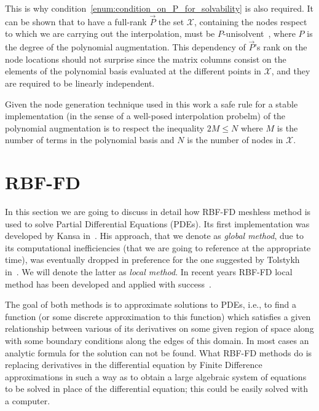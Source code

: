 This is why condition~\ref{enum:condition_on_P_for_solvability} is also required. It can be shown that to have a full-rank $\vec{P}$ the set $\mathcal{X}$, containing the nodes respect to which we are carrying out the interpolation, must be $P$-unisolvent~\cite{Fasshauer:details_on_basic_functions}, where $P$ is the degree of the polynomial augmentation. This dependency of $\vec{P}$'s rank on the node locations should not surprise since the matrix columns consist on the elements of the polynomial basis evaluated at the different points in $\mathcal{X}$, and they are required to be linearly independent.

Given the node generation technique used in this work a safe rule for a stable implementation (in the sense of a well-posed interpolation probelm) of the polynomial augmentation is to respect the inequality $2M \le N$ where $M$ is the number of terms in the polynomial basis and $N$ is the number of nodes in $\mathcal{X}$.



\section{RBF-FD}

In this section we are going to discuss in detail how RBF-FD meshless method is used to solve Partial Differential Equations (PDEs). Its first implementation was developed by Kansa in~\cite{Kansa:RBF_1,Kansa:RBF_2}. His approach, that we denote as \emph{global method}, due to its computational inefficiencies (that we are going to reference at the appropriate time), was eventually dropped in preference for the one suggested by Tolstykh in~\cite{Tolstykh:RBF_local}. We will denote the latter as \emph{local method}. In recent years RBF-FD local method has been developed and applied with success~\cite{Bueno:RBF-FD_application_1,Bueno:RBF-FD_application_2,Kosec:RBF-FD_application_3,Kosec:RBF-FD_application_4}.

The goal of both methods is to approximate solutions to PDEs, i.e., to find a function (or some discrete
approximation to this function) which satisfies a given relationship between various of its derivatives on some given region of space along with some boundary conditions along the edges of this domain. In most cases an analytic formula for the solution can not be found.
What RBF-FD methods do is replacing derivatives in the differential equation by Finite Difference approximations in such a way as to obtain a large algebraic system of equations to be solved in place of the differential equation; this could be easily solved with a computer.


